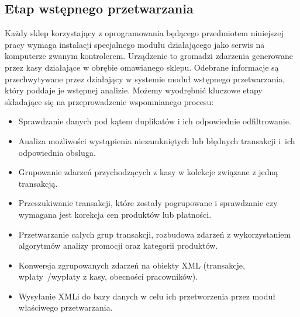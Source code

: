 \documentclass[a4paper]{book}
\begin{document}
\subsection{Etap wstępnego przetwarzania}
Każdy sklep korzystający z oprogramowania będącego przedmiotem niniejszej pracy wymaga instalacji specjalnego modułu działającego jako serwis na komputerze zwanym kontrolerem. Urządzenie to gromadzi zdarzenia generowane przez kasy działające w obrębie omawianego sklepu. Odebrane informacje są przechwytywane przez działający w systemie moduł wstępnego przetwarzania, który poddaje je wstępnej analizie. Możemy wyodrębnić kluczowe etapy składające się na przeprowadzenie wspomnianego procesu:
\begin{itemize}
	\item Sprawdzanie danych pod kątem duplikatów i ich odpowiednie odfiltrowanie.
	\item Analiza możliwości wystąpienia niezamkniętych lub błędnych transakcji i~ich odpowiednia obsługa.
	\item Grupowanie zdarzeń przychodzących z kasy w kolekcje związane z jedną transakcją.
	\item Przeszukiwanie transakcji, które zostały pogrupowane i sprawdzanie czy wymagana jest korekcja cen produktów lub płatności.
	\item Przetwarzanie całych grup transakcji, rozbudowa zdarzeń z wykorzystaniem algorytmów analizy promocji oraz kategorii produktów.
	\item Konwersja zgrupowanych zdarzeń na obiekty XML (transakcje, wpłaty~/wypłaty z kasy, obecności pracowników).
	\item Wysyłanie XMLi do bazy danych w celu ich przetworzenia przez moduł właściwego przetwarzania.
\end{itemize}
\end{document}
